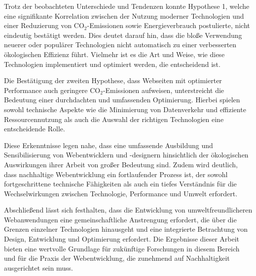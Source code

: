\documentclass[Bachelor,BIF,german,IEEE]{BASE/twbook}
\begin{document}
\noindent Trotz der beobachteten Unterschiede und Tendenzen konnte Hypothese 1, welche eine signifikante Korrelation zwischen der Nutzung moderner Technologien und einer Reduzierung von CO$_2$-Emissionen sowie Energieverbrauch postulierte, nicht eindeutig bestätigt werden. Dies deutet darauf hin, dass die bloße Verwendung neuerer oder populärer Technologien nicht automatisch zu einer verbesserten ökologischen Effizienz führt. Vielmehr ist es die Art und Weise, wie diese Technologien implementiert und optimiert werden, die entscheidend ist.\newline

\noindent Die Bestätigung der zweiten Hypothese, dass Webseiten mit optimierter Performance auch geringere CO$_2$-Emissionen aufweisen, unterstreicht die Bedeutung einer durchdachten und umfassenden Optimierung. Hierbei spielen sowohl technische Aspekte wie die Minimierung von Datenverkehr und effiziente Ressourcennutzung als auch die Auswahl der richtigen Technologien eine entscheidende Rolle.\newline

\noindent Diese Erkenntnisse legen nahe, dass eine umfassende Ausbildung und Sensibilisierung von Webentwicklern und -designern hinsichtlich der ökologischen Auswirkungen ihrer Arbeit von großer Bedeutung sind. Zudem wird deutlich, dass nachhaltige Webentwicklung ein fortlaufender Prozess ist, der sowohl fortgeschrittene technische Fähigkeiten als auch ein tiefes Verständnis für die Wechselwirkungen zwischen Technologie, Performance und Umwelt erfordert.\newline

\noindent Abschließend lässt sich festhalten, dass die Entwicklung von umweltfreundlicheren Webanwendungen eine gemeinschaftliche Anstrengung erfordert, die über die Grenzen einzelner Technologien hinausgeht und eine integrierte Betrachtung von Design, Entwicklung und Optimierung erfordert. Die Ergebnisse dieser Arbeit bieten eine wertvolle Grundlage für zukünftige Forschungen in diesem Bereich und für die Praxis der Webentwicklung, die zunehmend auf Nachhaltigkeit ausgerichtet sein muss.



\clearpage  
















\clearpage                                                       %
\end{document}
